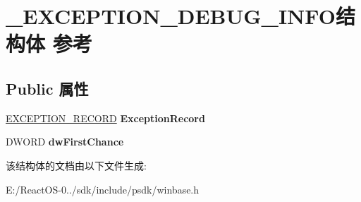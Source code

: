 \hypertarget{struct___e_x_c_e_p_t_i_o_n___d_e_b_u_g___i_n_f_o}{}\section{\+\_\+\+E\+X\+C\+E\+P\+T\+I\+O\+N\+\_\+\+D\+E\+B\+U\+G\+\_\+\+I\+N\+F\+O结构体 参考}
\label{struct___e_x_c_e_p_t_i_o_n___d_e_b_u_g___i_n_f_o}
\subsection*{Public 属性}
\begin{DoxyCompactItemize}
\item 
\mbox{\label{struct___e_x_c_e_p_t_i_o_n___d_e_b_u_g___i_n_f_o_a3be54ee5d82778f1222bcf04d637c850}} 
\hyperlink{struct___e_x_c_e_p_t_i_o_n___r_e_c_o_r_d}{E\+X\+C\+E\+P\+T\+I\+O\+N\+\_\+\+R\+E\+C\+O\+RD} {\bfseries Exception\+Record}
\item 
\mbox{\label{struct___e_x_c_e_p_t_i_o_n___d_e_b_u_g___i_n_f_o_a8d8acb7049cca30e8d23b0ef42e64633}} 
D\+W\+O\+RD {\bfseries dw\+First\+Chance}
\end{DoxyCompactItemize}


该结构体的文档由以下文件生成\+:\begin{DoxyCompactItemize}
\item 
E\+:/\+React\+O\+S-\/0../sdk/include/psdk/winbase.\+h\end{DoxyCompactItemize}
